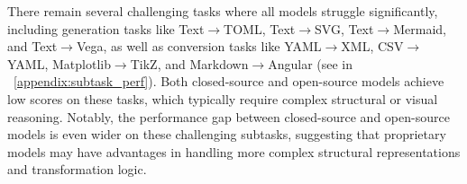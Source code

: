 There remain several challenging tasks where all models struggle significantly, including generation tasks like Text$\rightarrow$TOML, Text$\rightarrow$SVG, Text$\rightarrow$Mermaid, and Text$\rightarrow$Vega, as well as conversion tasks like YAML$\rightarrow$XML, CSV$\rightarrow$YAML, Matplotlib$\rightarrow$TikZ, and Markdown$\rightarrow$Angular (see in ~\autoref{appendix:subtask_perf}). Both closed-source and open-source models achieve low scores on these tasks, which typically require complex structural or visual reasoning. Notably, the performance gap between closed-source and open-source models is even wider on these challenging subtasks, suggesting that proprietary models may have advantages in handling more complex structural representations and transformation logic.
